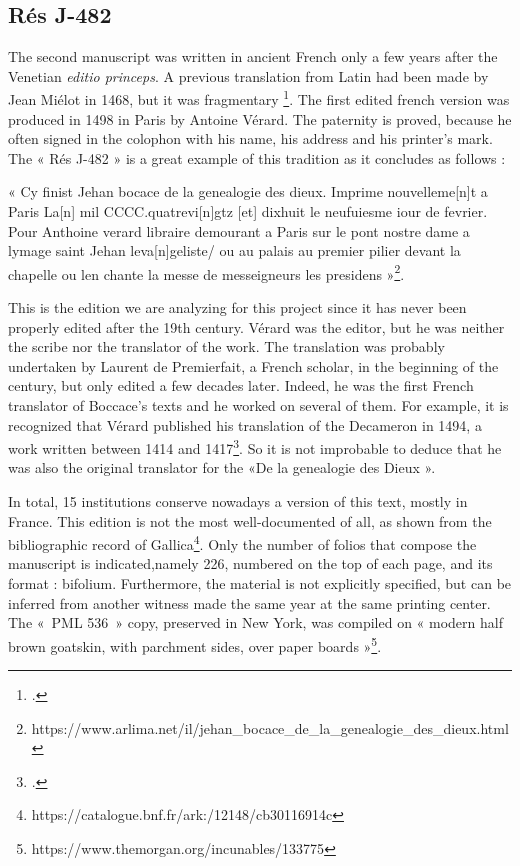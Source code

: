 \documentclass[12pt]{article}
\begin{document}
\subsection{Rés J-482}

The second manuscript was written in ancient French only a few years after the Venetian \textit{editio princeps}. A previous translation from Latin had been made by Jean Miélot in 1468, but it was fragmentary \footcite{galderisi2014}. The first edited french version was produced in 1498 in Paris by Antoine Vérard. The paternity is proved, because he often signed in the colophon with his name, his address and his printer's mark. The « Rés J-482 » is a great example of this tradition as it concludes as follows : 
 
\begin{displayquote}
 « Cy finist Jehan bocace de la genealogie des dieux. Imprime nouvelleme[n]t a Paris La[n] mil CCCC.quatrevi[n]gtz [et] dixhuit le neufuiesme iour de fevrier. Pour Anthoine verard libraire demourant a Paris sur le pont nostre dame a lymage saint Jehan leva[n]geliste/ ou au palais au premier pilier devant la chapelle ou len chante la messe de messeigneurs les presidens »\footnote{https://www.arlima.net/il/jehan_bocace_de_la_genealogie_des_dieux.html}.
\end{displayquote}


This is the edition we are analyzing for this project since it has never been properly edited after the 19th century. Vérard was the editor, but he was neither the scribe nor the translator of the work. The translation was probably undertaken by Laurent de Premierfait, a French scholar, in the beginning of the century, but only edited a few decades later. Indeed, he was the first French translator of Boccace's texts and he worked on several of them. For example, it is recognized that Vérard published his translation of the Decameron in 1494, a work written between 1414 and 1417\footcite{CarlaBozzolo}. So it is not improbable to deduce that he was also the original translator for the «De la genealogie des Dieux ». 

In total, 15 institutions conserve nowadays a version of this text, mostly in France. This edition is not the most well-documented of all, as shown from the bibliographic record of Gallica\footnote{https://catalogue.bnf.fr/ark:/12148/cb30116914c}. Only the number of folios that compose the manuscript is indicated,namely 226, numbered on the top of each page, and its format : bifolium. Furthermore, the material is not explicitly specified, but can be inferred from another witness made the same year at the same printing center. The « PML 536 » copy, preserved in New York, was compiled on « modern half brown goatskin, with parchment sides, over paper boards »\footnote{https://www.themorgan.org/incunables/133775}.
\end{document}

